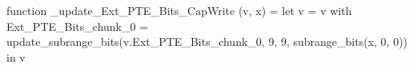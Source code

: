 function _update_Ext_PTE_Bits_CapWrite (v, x) = let v = { v with Ext_PTE_Bits_chunk_0 = update_subrange_bits(v.Ext_PTE_Bits_chunk_0, 9, 9, subrange_bits(x, 0, 0)) } in
  v
